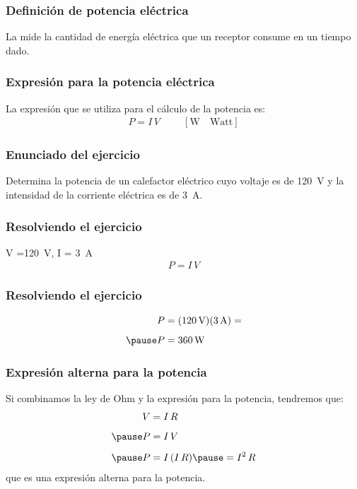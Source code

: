 \documentclass[14pt]{beamer}
\begin{document}
\begin{frame}
\frametitle{Definición de potencia eléctrica}
La  mide la cantidad de energía eléctrica que un receptor consume en un tiempo dado.
\end{frame}
\begin{frame}
\frametitle{Expresión para la potencia eléctrica}
La expresión que se utiliza para el cálculo de la potencia es:
\pause
\begin{align*}
P = I \, V \hspace{1cm} \left[ \unit{\watt} \quad \text{Watt} \right]
\end{align*}
\end{frame}
\begin{frame}
\frametitle{Enunciado del ejercicio}
Determina la potencia de un calefactor eléctrico cuyo voltaje es de \SI{120}{\volt} y la intensidad de la corriente eléctrica es de \SI{3}{\ampere}.
\end{frame}
\begin{frame}
\frametitle{Resolviendo el ejercicio}
 \pause V =\SI{120}{\volt}, \quad I = \SI{3}{\ampere}
\\
\bigskip
\pause
{}
\begin{align*}
P = I \, V
\end{align*} 
\end{frame}
\begin{frame}
\frametitle{Resolviendo el ejercicio}
\pause
\begin{eqnarray*}
\begin{aligned}
P &= (\SI{120}{\volt})(\SI{3}{\ampere}) = \\[0.5em] \pause
P &= \SI{360}{\watt}
\end{aligned}
\end{eqnarray*}
\end{frame}
\begin{frame}
\frametitle{Expresión alterna para la potencia}
Si combinamos la ley de Ohm y la expresión para la potencia, tendremos que:
\pause
\begin{eqnarray*}
\begin{aligned}
V &= I \, R \\[0.5em] \pause
P &= I \, V \\[0.5em] \pause
P &= I \, (I \, R)  \pause = I^{2} \, R
\end{aligned}
\end{eqnarray*}
que es una expresión alterna para la potencia.
\end{frame}
\end{document}
